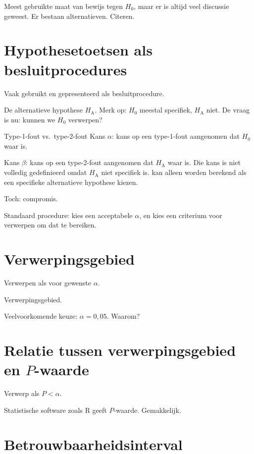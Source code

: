 \documentclass[
  a4paper,
]{scrbook}
\theoremstyle{definition}
\theoremstyle{definition}
\theoremstyle{remark}
\begin{document}
Meest gebruikte maat van bewijs tegen \(H_\textrm{0}\), maar er is
altijd veel discussie geweest. Er bestaan alternatieven. Citeren.

\section{Hypothesetoetsen als
besluitprocedures}\label{hypothesetoetsen-als-besluitprocedures}

Vaak gebruikt en gepresenteerd als besluitprocedure.

De alternatieve hypothese \(H_\textrm{A}\). Merk op: \(H_\textrm{0}\)
meestal specifiek, \(H_\textrm{A}\) niet. De vraag is nu: kunnen we
\(H_\textrm{0}\) verwerpen?

Type-1-fout vs.~type-2-fout Kans \(\alpha\): kans op een type-1-fout
aangenomen dat \(H_\textrm{0}\) waar is.

Kans \(\beta\): kans op een type-2-fout aangenomen dat \(H_\textrm{A}\)
waar is. Die kans is niet volledig gedefinieerd omdat \(H_\textrm{A}\)
niet specifiek is. kan alleen worden berekend als een specifieke
alternatieve hypothese kiezen.

Toch: compromis.

Standaard procedure: kies een acceptabele \(\alpha\), en kies een
criterium voor verwerpen om dat te bereiken.

\section{Verwerpingsgebied}\label{verwerpingsgebied}

Verwerpen als voor gewenste \(\alpha\).

Verwerpingsgebied.

Veelvoorkomende keuze: \(\alpha = 0{,}05\). Waarom?

\section{\texorpdfstring{Relatie tussen verwerpingsgebied en
\(P\)-waarde}{Relatie tussen verwerpingsgebied en P-waarde}}\label{relatie-tussen-verwerpingsgebied-en-p-waarde}

Verwerp als \(P < \alpha\).

Statistische software zoals R geeft \(P\)-waarde. Gemakkelijk.

\section{Betrouwbaarheidsinterval}\label{betrouwbaarheidsinterval}
\end{document}
